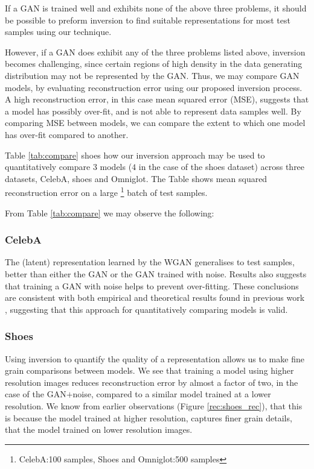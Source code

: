 \documentclass[journal]{IEEEtran}
\begin{document}
If a GAN is trained well and exhibits none of the above three problems, it should be possible to preform inversion to find suitable representations for most test samples using our technique.

However, if a GAN does exhibit any of the three problems listed above, inversion becomes challenging, since certain regions of high density in the data generating distribution may not be represented by the GAN. Thus, we may compare GAN models, by evaluating reconstruction error using our proposed inversion process. A high reconstruction error, in this case mean squared error (MSE), suggests that a model has possibly over-fit, and is not able to represent data samples well. By comparing MSE between models, we can compare the extent to which one model has over-fit compared to another. 

Table \ref{tab:compare} shoes how our inversion approach may be used to quantitatively compare $3$ models ($4$ in the case of the shoes dataset) across three datasets, CelebA, shoes and Omniglot. The Table shows mean squared reconstruction error on a large \footnote{CelebA:100 samples, Shoes and Omniglot:500 samples} batch of test samples.

From Table \ref{tab:compare} we may observe the following:

\subsubsection{CelebA}
The (latent) representation learned by the WGAN generalises to test samples, better than either the GAN or the GAN trained with noise. Results also suggests that training a GAN with noise helps to prevent over-fitting. These conclusions are consistent with both empirical and theoretical results found in previous work \cite{arjovsky2017wasserstein, arjovsky2017towards}, suggesting that this approach for quantitatively comparing models is valid.

\subsubsection{Shoes}
Using inversion to quantify the quality of a representation allows us to make fine grain comparisons between models. We see that training a model using higher resolution images reduces reconstruction error by almost a factor of two, in the case of the GAN$+$noise, compared to a similar model trained at a lower resolution. We know from earlier observations (Figure \ref{rec:shoes_rec}), that this is because the model trained at higher resolution, captures finer grain details, that the model trained on lower resolution images. 
\end{document}
